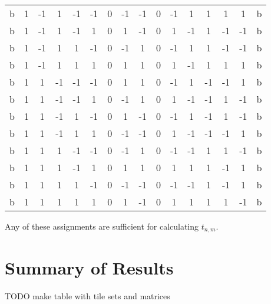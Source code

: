 \documentclass[12pt]{article}
\theoremstyle{plain}
\theoremstyle{definition}
\theoremstyle{remark}
\theoremstyle{definition}
\begin{document}
\begin{center}
\begin{tabular}{|c|c|c|c|c|c|c|c|c|c|c|c|c|c|c|c|}
b & 1 & -1 & 1 & -1 & -1 & 0 & -1 & -1 & 0 & -1 & 1 & 1 & 1 & 1 & b \\
b & 1 & -1 & 1 & -1 & 1 & 0 & 1 & -1 & 0 & 1 & -1 & 1 & -1 & -1 & b \\
b & 1 & -1 & 1 & 1 & -1 & 0 & -1 & 1 & 0 & -1 & 1 & 1 & -1 & -1 & b \\
b & 1 & -1 & 1 & 1 & 1 & 0 & 1 & 1 & 0 & 1 & -1 & 1 & 1 & 1 & b \\
b & 1 & 1 & -1 & -1 & -1 & 0 & 1 & 1 & 0 & -1 & 1 & -1 & -1 & 1 & b \\
b & 1 & 1 & -1 & -1 & 1 & 0 & -1 & 1 & 0 & 1 & -1 & -1 & 1 & -1 & b \\
b & 1 & 1 & -1 & 1 & -1 & 0 & 1 & -1 & 0 & -1 & 1 & -1 & 1 & -1 & b \\
b & 1 & 1 & -1 & 1 & 1 & 0 & -1 & -1 & 0 & 1 & -1 & -1 & -1 & 1 & b \\
b & 1 & 1 & 1 & -1 & -1 & 0 & -1 & 1 & 0 & -1 & -1 & 1 & 1 & -1 & b \\
b & 1 & 1 & 1 & -1 & 1 & 0 & 1 & 1 & 0 & 1 & 1 & 1 & -1 & 1 & b \\
b & 1 & 1 & 1 & 1 & -1 & 0 & -1 & -1 & 0 & -1 & -1 & 1 & -1 & 1 & b \\
b & 1 & 1 & 1 & 1 & 1 & 0 & 1 & -1 & 0 & 1 & 1 & 1 & 1 & -1 & b \\
\hline
\end{tabular}
\end{center}

Any of these assignments are sufficient for calculating $t_{n,m}$. 

\section{Summary of Results}
\label{section: summary of results}

TODO make table with tile sets and matrices

\printbibliography
\end{document}
